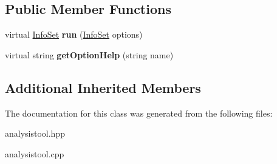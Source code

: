 \subsection*{Public Member Functions}
\begin{DoxyCompactItemize}
\item 
\hypertarget{classpct_1_1_analysis_tool_a468222469d5be7ff5d2fdc39730449f2}{virtual \hyperlink{classpct_1_1_info_set}{Info\-Set} {\bfseries run} (\hyperlink{classpct_1_1_info_set}{Info\-Set} options)}\label{classpct_1_1_analysis_tool_a468222469d5be7ff5d2fdc39730449f2}

\item 
\hypertarget{classpct_1_1_analysis_tool_ac4439367354e4b230b0b206ee9d2a331}{virtual string {\bfseries get\-Option\-Help} (string name)}\label{classpct_1_1_analysis_tool_ac4439367354e4b230b0b206ee9d2a331}

\end{DoxyCompactItemize}
\subsection*{Additional Inherited Members}


The documentation for this class was generated from the following files\-:\begin{DoxyCompactItemize}
\item 
analysistool.\-hpp\item 
analysistool.\-cpp\end{DoxyCompactItemize}
